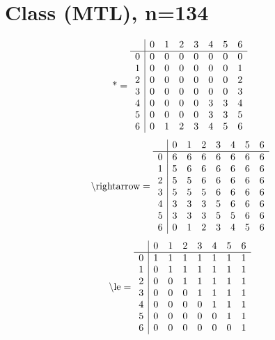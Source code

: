 \documentclass[11pt]{article}
\begin{document}
\section{Class (MTL), n=134}
\[\text{*} = 
\begin{array}{r | r r r r r r r}
 & 0 & 1 & 2 & 3 & 4 & 5 & 6 \\ \hline
0 & 0 & 0 & 0 & 0 & 0 & 0 & 0 \\
1 & 0 & 0 & 0 & 0 & 0 & 0 & 1 \\
2 & 0 & 0 & 0 & 0 & 0 & 0 & 2 \\
3 & 0 & 0 & 0 & 0 & 0 & 0 & 3 \\
4 & 0 & 0 & 0 & 0 & 3 & 3 & 4 \\
5 & 0 & 0 & 0 & 0 & 3 & 3 & 5 \\
6 & 0 & 1 & 2 & 3 & 4 & 5 & 6 \\
\end{array}
\]
\[\text{\textbackslash rightarrow} = 
\begin{array}{r | r r r r r r r}
 & 0 & 1 & 2 & 3 & 4 & 5 & 6 \\ \hline
0 & 6 & 6 & 6 & 6 & 6 & 6 & 6 \\
1 & 5 & 6 & 6 & 6 & 6 & 6 & 6 \\
2 & 5 & 5 & 6 & 6 & 6 & 6 & 6 \\
3 & 5 & 5 & 5 & 6 & 6 & 6 & 6 \\
4 & 3 & 3 & 3 & 5 & 6 & 6 & 6 \\
5 & 3 & 3 & 3 & 5 & 5 & 6 & 6 \\
6 & 0 & 1 & 2 & 3 & 4 & 5 & 6 \\
\end{array}
\]
\[\text{\textbackslash le} = 
\begin{array}{r | r r r r r r r}
 & 0 & 1 & 2 & 3 & 4 & 5 & 6 \\ \hline
0 & 1 & 1 & 1 & 1 & 1 & 1 & 1 \\
1 & 0 & 1 & 1 & 1 & 1 & 1 & 1 \\
2 & 0 & 0 & 1 & 1 & 1 & 1 & 1 \\
3 & 0 & 0 & 0 & 1 & 1 & 1 & 1 \\
4 & 0 & 0 & 0 & 0 & 1 & 1 & 1 \\
5 & 0 & 0 & 0 & 0 & 0 & 1 & 1 \\
6 & 0 & 0 & 0 & 0 & 0 & 0 & 1 \\
\end{array}
\]
\end{document}
